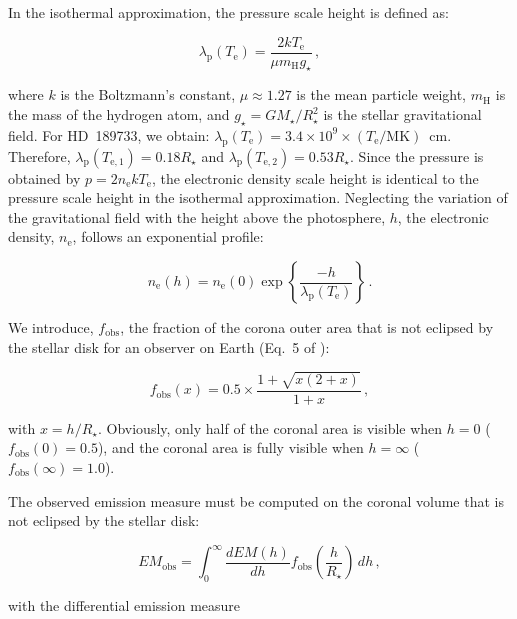 \documentclass[iop]{emulateapj}
\begin{document}
In the isothermal approximation, the pressure scale height is defined as:

\begin{equation}
  \lambda_\mathrm{p}(T_\mathrm{e})=\frac{2kT_\mathrm{e}}{\mu m_\mathrm{H}g_\star} \,,
  \label{eq:Lambdap}
\end{equation}

where $k$ is the Boltzmann's constant, $\mu\approx1.27$ is the mean particle weight, $m_\mathrm{H}$ is the mass of the hydrogen atom, 
and $g_\star=GM_\star/R_\star^2$ is the stellar gravitational field. 
For HD~189733, we obtain: 
$\lambda_\mathrm{p}(T_\mathrm{e})=3.4\times10^9\times(T_\mathrm{e}/\mathrm{MK})$~cm. Therefore, $\lambda_\mathrm{p}(T_\mathrm{e,1})=0.18 R_\star$ 
and $\lambda_\mathrm{p}(T_\mathrm{e,2})=0.53 R_\star$. Since the pressure is obtained by $p=2n_\mathrm{e}kT_\mathrm{e}$, the electronic
density scale height is identical to the pressure scale height in the isothermal approximation. Neglecting the variation of the gravitational 
field with the height above the photosphere, $h$, the electronic density, $n_\mathrm{e} $, follows an exponential profile:

\begin{equation}
  n_\mathrm{e}(h)=n_\mathrm{e}(0) 
  \exp{\!\left\{\frac{-h}{\lambda_\mathrm{p}(T_\mathrm{e})}\right\}} \,.
\end{equation}

We introduce, $f_\mathrm{obs}$, the fraction of the corona outer area that is not eclipsed by the stellar disk for an observer on 
Earth (Eq.~5 of \citealt{Schmitt1990}):

\begin{equation}
f_\mathrm{obs}(x)=0.5\times\frac{1+\sqrt{x(2+x)}}{1+x} \,,
\end{equation}

with $x=h/R_\star$. Obviously, only half of the coronal area is visible when $h=0$ ($f_\mathrm{obs}(0)=0.5$), and the coronal area is 
fully visible when $h=\infty$ ($f_\mathrm{obs}(\infty)=1.0$).

The observed emission measure must be computed on the coronal volume that is not eclipsed by the stellar disk:

\begin{equation}
EM_\mathrm{obs}=\int_0^\infty \frac{dEM(h)}{dh}
f_\mathrm{obs}\!\left(\frac{h}{R_\star}\right)\,dh \,,
\end{equation}

with the differential emission measure
\end{document}
